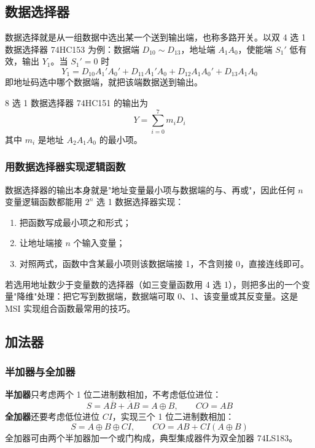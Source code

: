 \subsection{数据选择器}
数据选择就是从一组数据中选出某一个送到输出端，也称多路开关。以双 4 选 1 数据选择器 74HC153 为例：数据端 \(D_{10}\sim D_{13}\)，地址端 \(A_1A_0\)，使能端 \(S_1'\) 低有效，输出 \(Y_1\)。当 \(S_1'=0\) 时
\[
Y_1=D_{10}A_1'A_0'+D_{11}A_1'A_0+D_{12}A_1A_0'+D_{13}A_1A_0
\]
即地址码选中哪个数据端，就把该端数据送到输出。

8 选 1 数据选择器 74HC151 的输出为
\[
Y=\sum_{i=0}^{7}m_iD_i
\]
其中 \(m_i\) 是地址 \(A_2A_1A_0\) 的最小项。

\subsubsection{用数据选择器实现逻辑函数}
数据选择器的输出本身就是"地址变量最小项与数据端的与、再或"，因此任何 \(n\) 变量逻辑函数都能用 \(2^n\) 选 1 数据选择器实现：
\begin{enumerate}
    \item 把函数写成最小项之和形式；
    \item 让地址端接 \(n\) 个输入变量；
    \item 对照两式，函数中含某最小项则该数据端接 1，不含则接 0，直接连线即可。
\end{enumerate}
若选用地址数少于变量数的选择器（如三变量函数用 4 选 1），则把多出的一个变量"降维"处理：把它写到数据端，数据端可取 0、1、该变量或其反变量。这是 MSI 实现组合函数最常用的技巧。

\subsection{加法器}
\subsubsection{半加器与全加器}
\textbf{半加器}只考虑两个 1 位二进制数相加，不考虑低位进位：
\[
S=A\overline{B}+\overline{A}B=A\oplus B,\qquad CO=AB
\]
\textbf{全加器}还要考虑低位进位 \(CI\)，实现三个 1 位二进制数相加：
\[
S=A\oplus B\oplus CI,\qquad CO=AB+CI\left(A\oplus B\right)
\]
全加器可由两个半加器加一个或门构成，典型集成器件为双全加器 74LS183。

